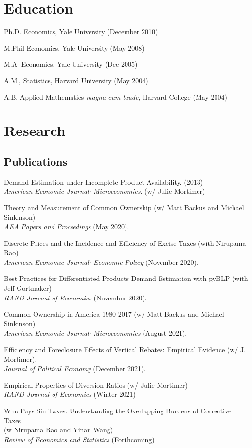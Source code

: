 \documentclass[letterpaper]{article}
\renewenvironment{itemize}{
  \begin{list}{}{
    \setlength{\leftmargin}{1.5em}
  }
}{
  \end{list}
}
\begin{document}
\section*{Education}

\begin{itemize}
\item Ph.D. Economics, Yale University (December 2010)
\item M.Phil Economics, Yale University (May 2008)
\item M.A. Economics, Yale University (Dec 2005)
\item A.M., Statistics, Harvard University (May 2004)
\item A.B. Applied Mathematics \textit{magna cum laude}, Harvard College (May 2004)

\end{itemize}



\section*{Research}
\subsection*{Publications}
\begin{itemize}
\item Demand Estimation under Incomplete Product Availability. (2013)\\
 \textit{American Economic Journal: Microeconomics}. (w/ Julie Mortimer)
\item Theory and Measurement of Common Ownership (w/ Matt Backus and Michael Sinkinson) \\\textit{AEA Papers and Proceedings} (May 2020).
\item Discrete Prices and the Incidence and Efficiency of Excise Taxes  (with Nirupama Rao)  \\\textit{American Economic Journal: Economic Policy} (November 2020). 
\item Best Practices for Differentiated Products Demand Estimation with pyBLP (with Jeff Gortmaker) \\\textit{RAND Journal of Economics} (November 2020).
\item Common Ownership in America 1980-2017 (w/ Matt Backus and Michael Sinkinson) \\\textit{American Economic Journal: Microeconomics} (August 2021).
\item Efficiency and Foreclosure Effects of Vertical Rebates: Empirical Evidence (w/ J. Mortimer). \\\textit{Journal of Political Economy} (December 2021).
\item Empirical Properties of Diversion Ratios (w/ Julie Mortimer)\\\textit{RAND Journal of Economics} (Winter 2021)
\item Who Pays Sin Taxes: Understanding the Overlapping Burdens of Corrective Taxes\\
 (w Nirupama Rao and Yinan Wang) \\
 \textit{Review of Economics and Statistics} (Forthcoming)
\end{itemize}
\end{document}
